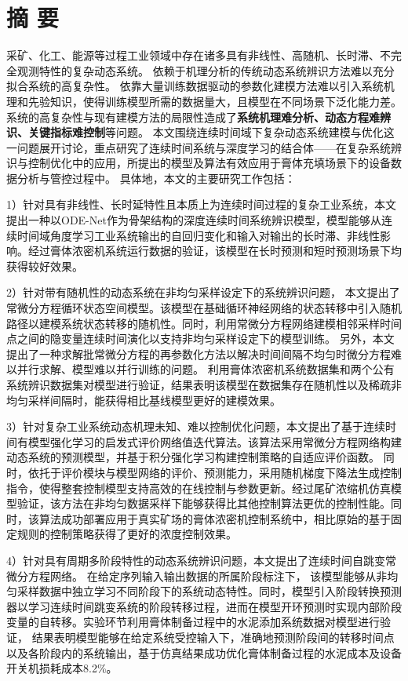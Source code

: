
\chapter*{ 摘 \space 要 }

采矿、化工、能源等过程工业领域中存在诸多具有非线性、高随机、长时滞、不完全观测特性的复杂动态系统。
依赖于机理分析的传统动态系统辨识方法难以充分拟合系统的高复杂性。
依靠大量训练数据驱动的参数化建模方法难以引入系统机理和先验知识，使得训练模型所需的数据量大，且模型在不同场景下泛化能力差。
系统的高复杂性与现有建模方法的局限性造成了\textbf{系统机理难分析、动态方程难辨识、关键指标难控制}等问题。
本文围绕连续时间域下复杂动态系统建模与优化这一问题展开讨论，重点研究了连续时间系统与深度学习的结合体——在复杂系统辨识与控制优化中的应用，所提出的模型及算法有效应用于膏体充填场景下的设备数据分析与管控过程中。
具体地，本文的主要研究工作包括：

1）针对具有非线性、长时延特性且本质上为连续时间过程的复杂工业系统，本文提出一种以ODE-Net作为骨架结构的深度连续时间系统辨识模型，模型能够从连续时间域角度学习工业系统输出的自回归变化和输入对输出的长时滞、非线性影响。经过膏体浓密机系统运行数据的验证，该模型在长时预测和短时预测场景下均获得较好效果。   

2）针对带有随机性的动态系统在非均匀采样设定下的系统辨识问题，
本文提出了常微分方程循环状态空间模型。该模型在基础循环神经网络的状态转移中引入随机路径以建模系统状态转移的随机性。同时，利用常微分方程网络建模相邻采样时间点之间的隐变量连续时间演化以支持非均匀采样设定下的模型训练。
另外，本文提出了一种求解批常微分方程的再参数化方法以解决时间间隔不均匀时微分方程难以并行求解、模型难以并行训练的问题。
利用膏体浓密机系统数据集和两个公有系统辨识数据集对模型进行验证，结果表明该模型在数据集存在随机性以及稀疏非均匀采样间隔时，能获得相比基线模型更好的建模效果。

3）针对复杂工业系统动态机理未知、难以控制优化问题，本文提出了基于连续时间有模型强化学习的启发式评价网络值迭代算法。该算法采用常微分方程网络构建动态系统的预测模型，并基于积分强化学习构建控制策略的自适应评价函数。
同时，依托于评价模块与模型网络的评价、预测能力，采用随机梯度下降法生成控制指令，使得整套控制模型支持高效的在线控制与参数更新。经过尾矿浓缩机仿真模型验证，该方法在非均匀数据采样下能够获得比其他控制算法更优的控制性能。同时，该算法成功部署应用于真实矿场的膏体浓密机控制系统中，相比原始的基于固定规则的控制策略获得了更好的浓度控制效果。

4）针对具有周期多阶段特性的动态系统辨识问题，本文提出了连续时间自跳变常微分方程网络。
在给定序列输入输出数据的所属阶段标注下，
该模型能够从非均匀采样数据中独立学习不同阶段下的系统动态特性。同时，模型引入阶段转换预测器以学习连续时间跳变系统的阶段转移过程，进而在模型开环预测时实现内部阶段变量的自转移。实验环节利用膏体制备过程中的水泥添加系统数据对模型进行验证，
结果表明模型能够在给定系统受控输入下，准确地预测阶段间的转移时间点以及各阶段内的系统输出，基于仿真结果成功优化膏体制备过程的水泥成本及设备开关机损耗成本8.2\%。


